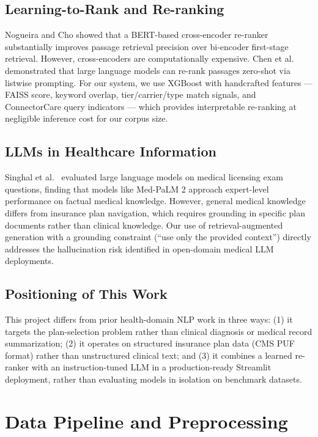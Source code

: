\documentclass[12pt, letterpaper]{article}
\begin{document}
\subsection{Learning-to-Rank and Re-ranking}

Nogueira and Cho \citep{nogueira2019passage} showed that a BERT-based cross-encoder re-ranker substantially improves passage retrieval precision over bi-encoder first-stage retrieval. However, cross-encoders are computationally expensive. Chen et al.\ \citep{chen2022rankgpt} demonstrated that large language models can re-rank passages zero-shot via listwise prompting. For our system, we use XGBoost with handcrafted features --- FAISS score, keyword overlap, tier/carrier/type match signals, and ConnectorCare query indicators --- which provides interpretable re-ranking at negligible inference cost for our corpus size.

\subsection{LLMs in Healthcare Information}

Singhal et al.\ \citep{singhal2023large} evaluated large language models on medical licensing exam questions, finding that models like Med-PaLM 2 approach expert-level performance on factual medical knowledge. However, general medical knowledge differs from insurance plan navigation, which requires grounding in specific plan documents rather than clinical knowledge. Our use of retrieval-augmented generation with a grounding constraint (``use only the provided context'') directly addresses the hallucination risk identified in open-domain medical LLM deployments.

\subsection{Positioning of This Work}

This project differs from prior health-domain NLP work in three ways: (1) it targets the plan-selection problem rather than clinical diagnosis or medical record summarization; (2) it operates on structured insurance plan data (CMS PUF format) rather than unstructured clinical text; and (3) it combines a learned re-ranker with an instruction-tuned LLM in a production-ready Streamlit deployment, rather than evaluating models in isolation on benchmark datasets.

\section{Data Pipeline and Preprocessing}
\label{sec:data}
\end{document}
